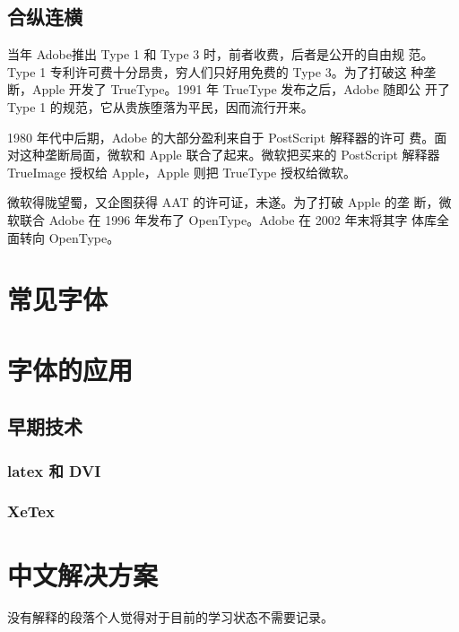\documentclass[UTF8]{article}
\begin{document}
\subsection{合纵连横}
当年 Adobe推出 Type 1 和 Type 3 时，前者收费，后者是公开的自由规
范。Type 1 专利许可费十分昂贵，穷人们只好用免费的 Type 3。为了打破这
种垄断，Apple 开发了 TrueType。1991 年 TrueType 发布之后，Adobe 随即公
开了 Type 1 的规范，它从贵族堕落为平民，因而流行开来。

1980 年代中后期，Adobe 的大部分盈利来自于 PostScript 解释器的许可
费。面对这种垄断局面，微软和 Apple 联合了起来。微软把买来的 PostScript
解释器 TrueImage 授权给 Apple，Apple 则把 TrueType 授权给微软。

微软得陇望蜀，又企图获得 AAT 的许可证，未遂。为了打破 Apple 的垄
断，微软联合 Adobe 在 1996 年发布了 OpenType。Adobe 在 2002 年末将其字
体库全面转向 OpenType。
	
\section{常见字体}
\section{字体的应用}	
\subsection{早期技术}
\subsubsection{latex 和 DVI}
\subsubsection{XeTex}

\section{中文解决方案}
没有解释的段落个人觉得对于目前的学习状态不需要记录。	
	
	
	
	
	
	
	
	
	
	
	
	
	
	
	
	
	
	
	
	
	
	
	
	
	
	
	
	
	
\end{document}
